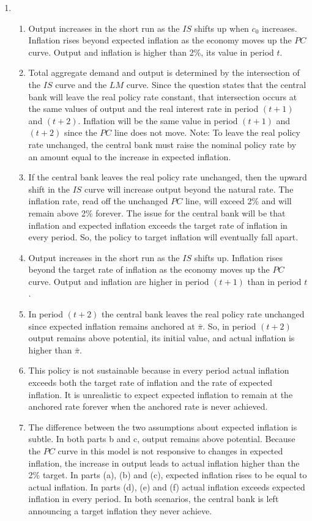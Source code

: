 \documentclass[12pt]{article}
\begin{document}
\begin{enumerate}[label=\arabic*.]
    \item \begin{enumerate}[label=(\alph*)]
        \item Output increases in the short run as the $IS$ shifts up when $c_0$ increases. Inflation rises beyond expected inflation as the economy moves up the $PC$ curve. Output and inflation is higher than 2\%, its value in period $t$.
        \item Total aggregate demand and output is determined by the intersection of the $IS$ curve and the $LM$ curve. Since the question states that the central bank will leave the real policy rate constant, that intersection occurs at the same values of output and the real interest rate in period $(t+1)$ and $(t+2)$. Inflation will be the same value in period $(t+1)$ and $(t+2)$ since the $PC$ line does not move. Note: To leave the real policy rate unchanged, the central bank must raise the nominal policy rate by an amount equal to the increase in expected inflation.
        \item If the central bank leaves the real policy rate unchanged, then the upward shift in the $IS$ curve will increase output beyond the natural rate. The inflation rate, read off the unchanged $PC$ line, will exceed 2\% and will remain above 2\% forever. The issue for the central bank will be that inflation and expected inflation exceeds the target rate of inflation in every period. So, the policy to target inflation will eventually fall apart.
        \item Output increases in the short run as the $IS$ shifts up. Inflation rises beyond the target rate of inflation as the economy moves up the $PC$ curve. Output and inflation are higher in period $(t+1)$ than in period $t$.
        \item In period $(t+2)$ the central bank leaves the real policy rate unchanged since expected inflation remains anchored at $\bar{\pi}$. So, in period $(t+2)$ output remains above potential, its initial value, and actual inflation is higher than $\bar{\pi}$.
        \item This policy is not sustainable because in every period actual inflation exceeds both the target rate of inflation and the rate of expected inflation. It is unrealistic to expect expected inflation to remain at the anchored rate forever when the anchored rate is never achieved.
        \item The difference between the two assumptions about expected inflation is subtle. In both parts b and c, output remains above potential. Because the $PC$ curve in this model is not responsive to changes in expected inflation, the increase in output leads to actual inflation higher than the 2\% target. In parts (a), (b) and (c), expected inflation rises to be equal to actual inflation. In parts (d), (e) and (f) actual inflation exceeds expected inflation in every period. In both scenarios, the central bank is left announcing a target inflation they never achieve.

\end{enumerate}
\end{enumerate}
\end{document}
